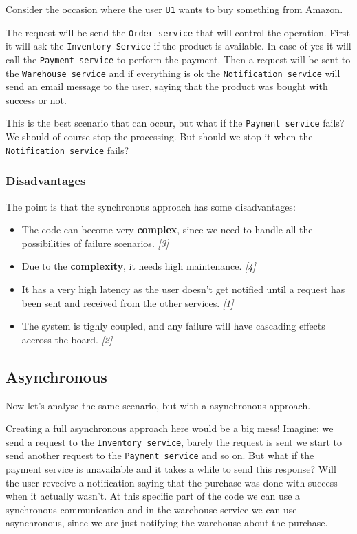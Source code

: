 Consider the occasion where the user \texttt{U1} wants to buy something from Amazon.

The request will be send the \texttt{Order service} that will control the operation.  
First it will ask the \texttt{Inventory Service} if the product is available. In case of yes
it will call the \texttt{Payment service} to perform the payment. Then a request will be sent 
to the \texttt{Warehouse service} and if everything is ok the \texttt{Notification service} 
will send an email message to the user, saying that the product was bought with success or not. 

This is the best scenario that can occur, but what if the \texttt{Payment service} fails? 
We should of course stop the processing. But should we stop it when the \texttt{Notification service} fails? 

\subsubsection{Disadvantages}


The point is that the synchronous approach has some disadvantages: 
\begin{itemize}
    \item The code can become very \textbf{complex}, since we need to handle all the 
    possibilities of failure scenarios. \textit{[3]}
    \item Due to the \textbf{complexity}, it needs high maintenance. \textit{[4]}
    \item It has a very high latency as the user doesn't get notified until a request 
    has been sent and received from the other services. \textit{[1]}
    \item The system is tighly coupled, and any failure will have cascading effects accross the 
    board. \textit{[2]}
\end{itemize}

\subsection{Asynchronous} 

Now let's analyse the same scenario, but with a asynchronous approach.

Creating a full asynchronous approach here would be a big mess! Imagine: we 
send a request to the \texttt{Inventory service}, barely the request is sent we 
start to send another request to the \texttt{Payment service} and so on. But what 
if the payment service is unavailable and it takes a while to send this response?   
Will the user revceive a notification saying that the purchase was done with success 
when it actually wasn't. At this specific part of the code we can use a synchronous
communication and in the warehouse service we can use asynchronous, since we are just
notifying the warehouse about the purchase. 


